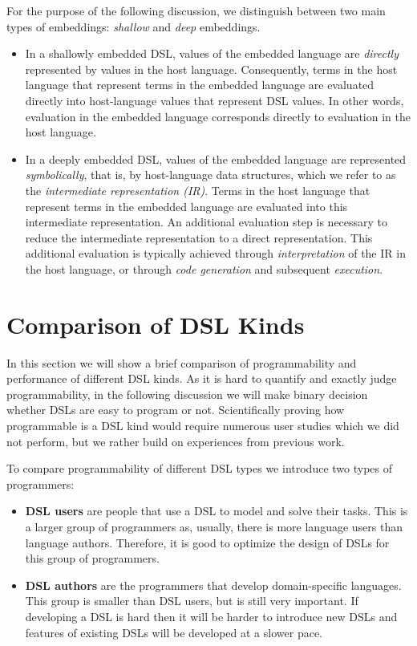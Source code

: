 For the purpose of the following discussion, we distinguish between two main types of embeddings: \emph{shallow} and
\emph{deep} embeddings.

  \begin{itemize}

  \item In a shallowly embedded DSL, values of the embedded language
    are \emph{directly} represented by values in the host language.
    Consequently, terms in the host language that represent terms in
    the embedded language are evaluated directly into host-language
    values that represent DSL values. In other words, evaluation in
    the embedded language corresponds directly to evaluation in the
    host language.

  \item In a deeply embedded DSL, values of the embedded language are
    represented \emph{symbolically}, that is, by host-language data
    structures, which we refer to as the \emph{intermediate
      representation (IR)}. Terms in the host language that represent
    terms in the embedded language are evaluated into this intermediate
    representation. An additional evaluation step is necessary to
    reduce the intermediate representation to a direct representation.
    This additional evaluation is typically achieved through
    \emph{interpretation} of the IR in the host language, or through
    \emph{code generation} and subsequent \emph{execution}.

  \end{itemize}


\section{Comparison of DSL Kinds}
\label{sec:comparison-of-dsl-kinds}
In this section we will show a brief comparison of programmability and performance
 of different DSL kinds. As it is hard to quantify and exactly judge programmability,
 in the following discussion we will make binary decision whether DSLs are easy to
 program or not. Scientifically proving how programmable is a DSL kind would require
 numerous user studies which we did not perform, but we rather build on experiences
 from previous work.

To compare programmability of different DSL types we introduce two types of programmers:\begin{itemize}
  \item {\bf DSL users} are people that use a DSL to model and solve their tasks. This is a larger group of
   programmers as, usually, there is more language users than language authors. Therefore, it is good
   to optimize the design of DSLs for this group of programmers.

  \item {\bf DSL authors} are the programmers that develop domain-specific languages. This
   group is smaller than DSL users, but is still very important. If developing a DSL is hard
   then it will be harder to introduce new DSLs and features of existing DSLs will be
   developed at a slower pace.
 \end{itemize}

